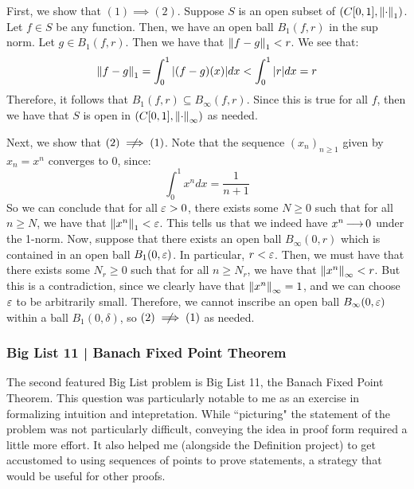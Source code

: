 \begin{soln}
    First, we show that $ (1) \implies (2) $.
    Suppose $ S $ is an open subset of $ (C[0, 1], \left\|\cdot\right\|_{1}) $.
    Let $ f \in S $ be any function.
    Then, we have an open ball $ B_{1}(f, r) $ in the sup norm.
    Let $ g \in B_{1}(f, r) $. Then we have that $ \left\|f - g\right\|_{1} < r $.
    We see that:
    \begin{equation*}
        \left\|f - g\right\|_{1} = \int_{0}^{1} \abs{(f - g)(x)} dx < \int_{0}^{1}
        \abs{r} dx = r
    \end{equation*}
    Therefore, it follows that $ B_{1}(f, r) \subseteq B_{\infty}(f, r) $.
    Since this is true for all $ f $, then we have that $ S $ is open in
    $ (C[0, 1], \left\|\cdot\right\|_{\infty}) $ as needed. \npgh

    Next, we show that $ (2) \cnot\implies (1) $. Note that the sequence
    $ (x_{n})_{n \geq 1} $ given by $ x_{n} = x^{n} $ converges to $ 0 $, since:
    \begin{equation*}
        \int_{0}^{1} x^{n} dx = \frac{1}{n + 1}
    \end{equation*}
    So we can conclude that for all $ \operatorname{\varepsilon} > 0 $, there exists some $ N \geq 0 $
    such that
    for all $ n \geq N $, we have that $ \left\|x^{n}\right\|_{1} < \operatorname{\varepsilon} $.
    This tells us that we indeed have $ x^{n} \operatorname{\longrightarrow} 0 $ under the 1-norm. \vsp
    Now, suppose that there exists an open ball $ B_{\infty}(0, r) $ which is
    contained in an open ball $ B_{1}(0, \operatorname{\varepsilon}) $. In particular, $ r < \operatorname{\varepsilon} $.
    \vsp
    Then, we must have that there exists some $ N_{r} \geq 0 $ such that for all
    $ n \geq N_{r} $,
    we have that $ \left\|x^{n}\right\|_{\infty} < r $. But this is a contradiction,
    since we clearly have that $ \left\|x^{n}\right\|_{\infty} = 1 $, and we can choose
    $ \operatorname{\varepsilon} $ to be arbitrarily small.
    Therefore, we cannot inscribe an open ball $ B_{\infty}(0, \operatorname{\varepsilon}) $ within
    a ball $ B_{1}(0, \delta) $, so $ (2) \cnot \implies (1) $ as needed.
\end{soln}

\newpage

\subsubsection{Big List 11 | Banach Fixed Point Theorem}

The second featured Big List problem is Big List 11, the Banach Fixed Point
Theorem. This question was particularly notable to me as an exercise in
formalizing intuition and intepretation. While ``picturing" the statement of the
problem was not particularly difficult, conveying the idea in proof form
required a little more effort. It also helped me (alongside the Definition
project) to get accustomed to using sequences of points to prove statements, a
strategy that would be useful for other proofs.

